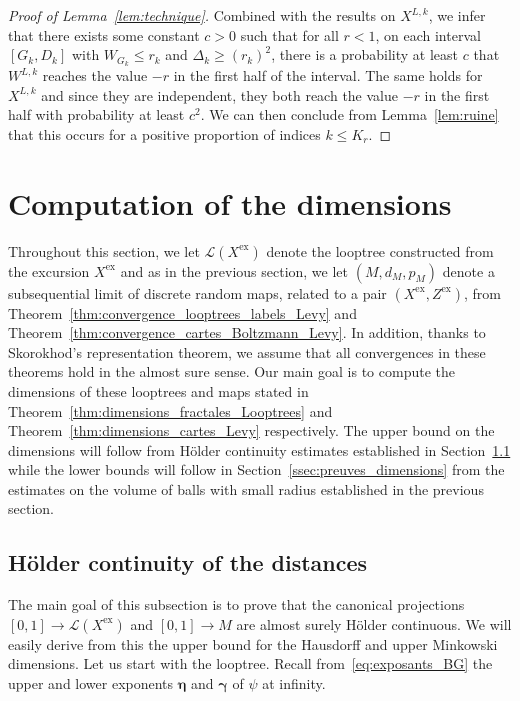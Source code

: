 \documentclass[british, a4paper,11pt]{article}
\numberwithin{equation}{section}
\theoremstyle{definition}
\newcommand{\Loop}{\mathscr{L}}
\newcommand{\Map}{M}
\newcommand{\bdgamma}{\boldsymbol{\gamma}}
\newcommand{\bdeta}{\boldsymbol{\eta}}
\newcommand{\exc}{\mathrm{ex}}
\begin{document}
\begin{proof}[Proof of Lemma~\ref{lem:technique}]
Combined with the results on $X^{L,k}$, we infer that there exists some constant $c > 0$ such that for all $r<1$, on each interval $[G_k,D_k]$ with $W_{G_k} \leq r_{k}$ and $\Delta_k \geq (r_{k})^2$, there is a probability at least $c$ that $W^{L,k}$ reaches the value $-r$ in the first half of the interval. The same holds for $X^{L,k}$ and since they are independent, they both reach the value $-r$ in the first half with probability at least $c^2$. We can then conclude from Lemma~\ref{lem:ruine} that this occurs for a positive proportion of indices $k \leq K_r$.
\end{proof}





\section{Computation of the dimensions}
\label{sec:dim_preuves}


Throughout this section, we let 
$\Loop(X^{\exc})$ denote the looptree constructed from the excursion $X^{\exc}$ and as in the previous section, we let $(\Map,d_\Map,p_\Map)$ denote a subsequential limit of discrete random maps, related to a pair $(X^{\exc}, Z^{\exc})$, from Theorem~\ref{thm:convergence_looptrees_labels_Levy} and Theorem~\ref{thm:convergence_cartes_Boltzmann_Levy}. In addition, thanks to Skorokhod's representation theorem, we assume that all convergences in these theorems hold in the almost sure sense.
Our main goal is to compute the dimensions of these looptrees and maps stated in Theorem~\ref{thm:dimensions_fractales_Looptrees} and Theorem~\ref{thm:dimensions_cartes_Levy} respectively.
The upper bound on the dimensions will follow from H\"older continuity estimates established in 
Section~\ref{ssec:Holder}
while the lower bounds will follow in Section~\ref{ssec:preuves_dimensions} from the estimates on the volume of balls with small radius established in the previous section.


\subsection{H\"older continuity of the distances}
\label{ssec:Holder}

The main goal of this subsection is to prove that the canonical projections $[0,1] \to \Loop(X^{\exc})$ and $[0,1] \to \Map$ are almost surely H\"older continuous.
We will easily derive from this the upper bound for the Hausdorff and upper Minkowski dimensions.
Let us start with the looptree.
Recall from~\eqref{eq:exposants_BG} the upper and lower exponents $\bdeta$ and $\bdgamma$ of $\psi$ at infinity.
\end{document}
